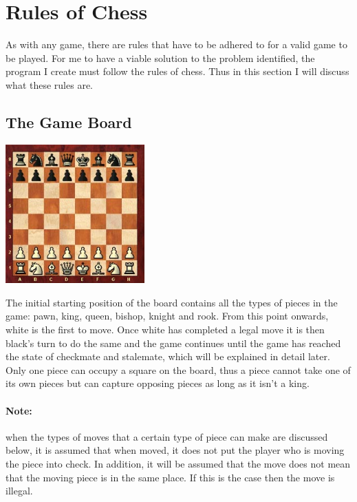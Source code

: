 \documentclass[]{report}
\begin{document}
\section{Rules of Chess}
As with any game, there are rules that have to be adhered to for a valid game to be played. For me to have a viable solution to the problem identified, the program I create must follow the rules of chess. Thus in this section I will discuss what these rules are.
\subsection{The Game Board}
\begin{center}
	\includegraphics[width=0.4\textwidth]{images/boards/initial_board}
\end{center}
The initial starting position of the board contains all the types of pieces in the game: pawn, king, queen, bishop, knight and rook. From this point onwards, white is the first to move. Once white has completed a legal move it is then black's turn to do the same and the game continues until the game has reached the state of checkmate and stalemate, which will be explained in detail later. Only one piece can occupy a square on the board, thus a piece cannot take one of its own pieces but can capture opposing pieces as long as it isn't a king.

\paragraph{Note:}when the types of moves that a certain type of piece can make are discussed below, it is assumed that when moved, it does not put the player who is moving the piece into check. In addition, it will be assumed that the move does not mean that the moving piece is in the same place. If this is the case then the move is illegal.
\end{document}
